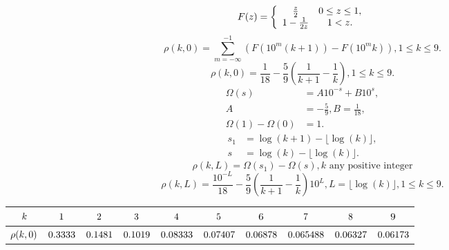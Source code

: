 \documentclass[titlepage,fleqn]{article}%
\begin{document}
\[
F(z)=\left\{
\begin{array}
[c]{cc}%
\frac{z}{2} & 0\leq z\leq1,\\
1-\frac{1}{2z} & 1<z.
\end{array}
\right.
\]%
\[
\rho(k,0)=%
{\displaystyle\sum\limits_{m=-\infty}^{-1}}
\left(  F(10^{m}(k+1))-F(10^{m}k)\right)  ,1\leq k\leq9.
\]%
\begin{equation}
\rho(k,0)=\frac{1}{18}-\frac{5}{9}\left(  \frac{1}{k+1}-\frac{1}{k}\right)
,1\leq k\leq9. \label{Rati01}%
\end{equation}%
\begin{align*}
\Omega(s)  &  =A10^{-s}+B10^{s},\\
A  &  =-\frac{5}{9},B=\frac{1}{18},\\
\Omega(1)-\Omega(0)  &  =1.
\end{align*}%
\begin{align*}
s_{1}  &  =\log(k+1)-\lfloor\log(k)\rfloor,\\
s  &  =\log(k)-\lfloor\log(k)\rfloor.
\end{align*}%
\[
\rho(k,L)=\Omega(s_{1})-\Omega(s),k\text{ \ any positive integer}%
\]%
\begin{equation}
\rho(k,L)=\frac{10^{-L}}{18}-\frac{5}{9}\left(  \frac{1}{k+1}-\frac{1}%
{k}\right)  10^{L},L=\lfloor\log(k)\rfloor,1\leq k\leq9. \label{Ratio2}%
\end{equation}%
\begin{tabular}
[c]{|c|c|c|c|c|c|c|c|c|c|}\hline\hline
${\small k}$ & ${\small 1}$ & ${\small 2}$ & ${\small 3}$ & ${\small 4}$ &
${\small 5}$ & ${\small 6}$ & ${\small 7}$ & ${\small 8}$ & ${\small 9}%
$\\\hline
${\small \rho(k,0)}$ & ${\small 0.3333}$ & ${\small 0.1481}$ &
${\small 0.1019}$ & ${\small 0.08333}$ & ${\small 0.07407}$ &
${\small 0.06878}$ & ${\small 0.065488}$ & ${\small 0.06327}$ &
${\small 0.06173}$\\\hline\hline
\end{tabular}


\bigskip
\end{document}
